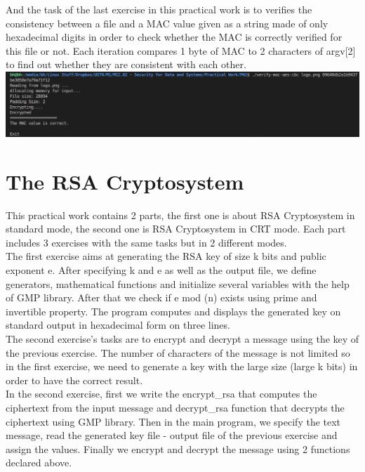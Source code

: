 \documentclass{article}
\begin{document}
And the task of the last exercise in this practical work is to verifies the consistency between a file and a MAC value given as a string made of only hexadecimal digits in order to check whether the MAC is correctly verified for this file or not. Each iteration compares 1 byte of MAC to 2 characters of argv[2] to find out whether they are consistent with each other. 
\\


\includegraphics[width=\linewidth]{verify}
\\

\section{The RSA Cryptosystem}
This practical work contains 2 parts, the first one is about RSA Cryptosystem in standard mode, the second one is RSA Cryptosystem in CRT mode. Each part includes 3 exercises with the same tasks but in 2 different modes. 
\\

The first exercise aims at generating the RSA key of size k bits and public exponent e. After specifying k and e as well as the output file, we define generators, mathematical functions and initialize several variables with the help of GMP library. After that we check if e mod \phi(n)\) exists using prime and invertible property. The program computes and displays the generated key on standard output in hexadecimal form on three lines. 
\\

The second exercise's tasks are to encrypt and decrypt a message using the key of the previous exercise. The number of characters of the message is not limited so in the first exercise, we need to generate a key with the large size (large k bits) in order to have the correct result. 
\\

In the second exercise, first we write the encrypt\_rsa that computes the ciphertext from the input message and decrypt\_rsa function that decrypts the ciphertext using GMP library. Then in the main program, we specify the text message, read the generated key file - output file of the previous exercise and assign the values. Finally we encrypt and decrypt the message using 2 functions declared above. 
\\
\end{document}
